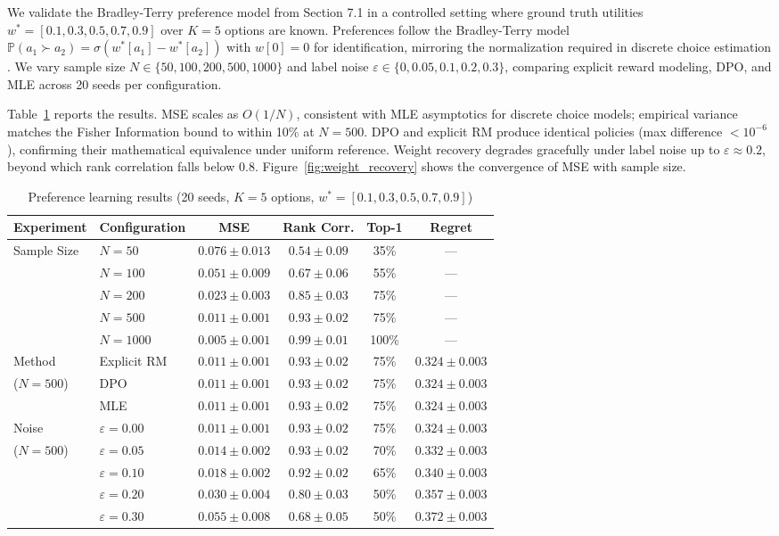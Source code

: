 We validate the Bradley-Terry preference model from Section 7.1 in a controlled setting where ground truth utilities $w^* = [0.1, 0.3, 0.5, 0.7, 0.9]$ over $K=5$ options are known. Preferences follow the Bradley-Terry model $\mathbb{P}(a_1 \succ a_2) = \sigma(w^*[a_1] - w^*[a_2])$ with $w[0] = 0$ for identification, mirroring the normalization required in discrete choice estimation \citep{mcfadden:1973}. We vary sample size $N \in \{50, 100, 200, 500, 1000\}$ and label noise $\varepsilon \in \{0, 0.05, 0.1, 0.2, 0.3\}$, comparing explicit reward modeling, DPO, and MLE across 20 seeds per configuration.

Table~\ref{tab:rlhf_results} reports the results. MSE scales as $O(1/N)$, consistent with MLE asymptotics for discrete choice models; empirical variance matches the Fisher Information bound to within 10\% at $N=500$. DPO and explicit RM produce identical policies (max difference $<10^{-6}$), confirming their mathematical equivalence under uniform reference. Weight recovery degrades gracefully under label noise up to $\varepsilon \approx 0.2$, beyond which rank correlation falls below 0.8. Figure~\ref{fig:weight_recovery} shows the convergence of MSE with sample size.

\begin{table}[htbp]
\centering
\caption{Preference learning results (20 seeds, $K=5$ options, $w^* = [0.1, 0.3, 0.5, 0.7, 0.9]$)}
\label{tab:rlhf_results}
\begin{tabular}{llcccc}
\toprule
Experiment & Configuration & MSE & Rank Corr. & Top-1 & Regret \\
\midrule
Sample Size & $N=50$ & $0.076 \pm 0.013$ & $0.54 \pm 0.09$ & 35\% & --- \\
 & $N=100$ & $0.051 \pm 0.009$ & $0.67 \pm 0.06$ & 55\% & --- \\
 & $N=200$ & $0.023 \pm 0.003$ & $0.85 \pm 0.03$ & 75\% & --- \\
 & $N=500$ & $0.011 \pm 0.001$ & $0.93 \pm 0.02$ & 75\% & --- \\
 & $N=1000$ & $0.005 \pm 0.001$ & $0.99 \pm 0.01$ & 100\% & --- \\
\midrule
Method & Explicit RM & $0.011 \pm 0.001$ & $0.93 \pm 0.02$ & 75\% & $0.324 \pm 0.003$ \\
($N=500$) & DPO & $0.011 \pm 0.001$ & $0.93 \pm 0.02$ & 75\% & $0.324 \pm 0.003$ \\
 & MLE & $0.011 \pm 0.001$ & $0.93 \pm 0.02$ & 75\% & $0.324 \pm 0.003$ \\
\midrule
Noise & $\varepsilon=0.00$ & $0.011 \pm 0.001$ & $0.93 \pm 0.02$ & 75\% & $0.324 \pm 0.003$ \\
($N=500$) & $\varepsilon=0.05$ & $0.014 \pm 0.002$ & $0.93 \pm 0.02$ & 70\% & $0.332 \pm 0.003$ \\
 & $\varepsilon=0.10$ & $0.018 \pm 0.002$ & $0.92 \pm 0.02$ & 65\% & $0.340 \pm 0.003$ \\
 & $\varepsilon=0.20$ & $0.030 \pm 0.004$ & $0.80 \pm 0.03$ & 50\% & $0.357 \pm 0.003$ \\
 & $\varepsilon=0.30$ & $0.055 \pm 0.008$ & $0.68 \pm 0.05$ & 50\% & $0.372 \pm 0.003$ \\
\bottomrule
\end{tabular}
\end{table}


